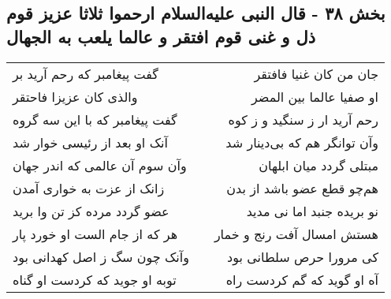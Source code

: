 \begin{center}
\section*{بخش ۳۸ - قال النبی علیه‌السلام ارحموا ثلاثا عزیز قوم ذل و غنی قوم افتقر و عالما یلعب به الجهال}
\label{sec:sh038}
\begin{longtable}{l p{0.5cm} r}
گفت پیغامبر که رحم آرید بر
&&
جان من کان غنیا فافتقر
\\
والذی کان عزیزا فاحتقر
&&
او صفیا عالما بین المضر
\\
گفت پیغامبر که با این سه گروه
&&
رحم آرید ار ز سنگید و ز کوه
\\
آنک او بعد از رئیسی خوار شد
&&
وآن توانگر هم که بی‌دینار شد
\\
وآن سوم آن عالمی که اندر جهان
&&
مبتلی گردد میان ابلهان
\\
زانک از عزت به خواری آمدن
&&
هم‌چو قطع عضو باشد از بدن
\\
عضو گردد مرده کز تن وا برید
&&
نو بریده جنبد اما نی مدید
\\
هر که از جام الست او خورد پار
&&
هستش امسال آفت رنج و خمار
\\
وآنک چون سگ ز اصل کهدانی بود
&&
کی مرورا حرص سلطانی بود
\\
توبه او جوید که کردست او گناه
&&
آه او گوید که گم کردست راه
\\
\end{longtable}
\end{center}
